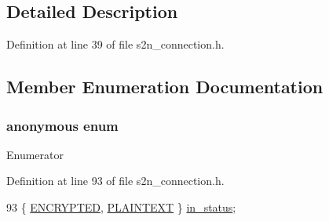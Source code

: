 \subsection{Detailed Description}


Definition at line 39 of file s2n\+\_\+connection.\+h.



\subsection{Member Enumeration Documentation}
\subsubsection[{\texorpdfstring{anonymous enum}{anonymous enum}}]{\setlength{\rightskip}{0pt plus 5cm}anonymous enum}\hypertarget{structs2n__connection_abe974f22edeef8189603ba75fd90ff3c}{}\label{structs2n__connection_abe974f22edeef8189603ba75fd90ff3c}
\begin{Desc}
\item[Enumerator]\par
\begin{description}
\item[{\em 
E\+N\+C\+R\+Y\+P\+T\+ED\hypertarget{structs2n__connection_abe974f22edeef8189603ba75fd90ff3caaac875c4dc08055725dd966fd44e0839}{}\label{structs2n__connection_abe974f22edeef8189603ba75fd90ff3caaac875c4dc08055725dd966fd44e0839}
}]\item[{\em 
P\+L\+A\+I\+N\+T\+E\+XT\hypertarget{structs2n__connection_abe974f22edeef8189603ba75fd90ff3ca32dd92f4aa3e7642b89daf8fe17d852c}{}\label{structs2n__connection_abe974f22edeef8189603ba75fd90ff3ca32dd92f4aa3e7642b89daf8fe17d852c}
}]\end{description}
\end{Desc}


Definition at line 93 of file s2n\+\_\+connection.\+h.


\begin{DoxyCode}
93 \{ \hyperlink{structs2n__connection_abe974f22edeef8189603ba75fd90ff3caaac875c4dc08055725dd966fd44e0839}{ENCRYPTED}, \hyperlink{structs2n__connection_abe974f22edeef8189603ba75fd90ff3ca32dd92f4aa3e7642b89daf8fe17d852c}{PLAINTEXT} \} \hyperlink{structs2n__connection_ad63a0cc0cc12429207575e5d093f59d2}{in\_status};
\end{DoxyCode}


